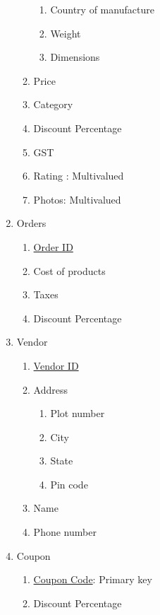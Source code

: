 \documentclass[12pt]{report}
\begin{document}
\begin{enumerate}
\begin{enumerate}
\begin{enumerate}
                        \item Country of manufacture
                        \item Weight 
                        \item Dimensions
                    \end{enumerate}
                \item Price
                \item Category
                \item Discount Percentage
                \item GST
                \item Rating : Multivalued
                \item Photos: Multivalued
            \end{enumerate}
        \item Orders
            \begin{enumerate}
                \item \underline{Order ID}
                \item Cost of products
                \item Taxes
                \item Discount Percentage
            \end{enumerate}
        \item Vendor
            \begin{enumerate}
                \item \underline{Vendor ID}
                \item Address
                    \begin{enumerate}
                        \item Plot number
                        \item City
                        \item State
                        \item Pin code
                    \end{enumerate}
                \item Name
                \item Phone number
            \end{enumerate}
        \item Coupon
            \begin{enumerate}
                \item \underline{Coupon Code}: Primary key
                \item Discount Percentage

\end{enumerate}
\end{enumerate}
\end{document}
